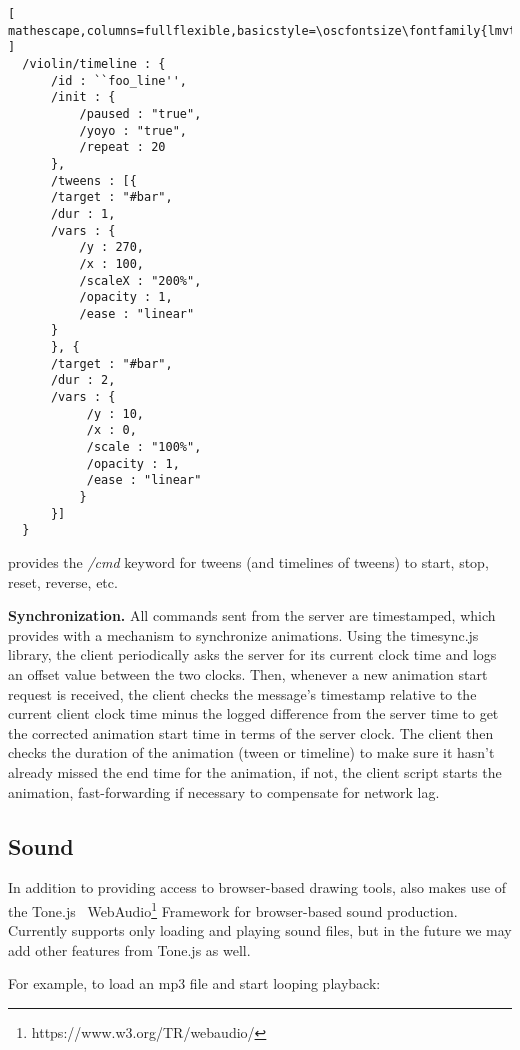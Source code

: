 \begin{minipage}{\linewidth}
\begin{lstlisting}[ mathescape,columns=fullflexible,basicstyle=\oscfontsize\fontfamily{lmvtt}\selectfont ]
  /violin/timeline : {
      /id : ``foo_line'',
      /init : {
          /paused : "true",
          /yoyo : "true",
          /repeat : 20
      },
      /tweens : [{
	  /target : "#bar",
	  /dur : 1,
	  /vars : {
	      /y : 270,
	      /x : 100,
	      /scaleX : "200%",
	      /opacity : 1,
	      /ease : "linear"
	  }
      }, {
	  /target : "#bar",
	  /dur : 2,
	  /vars : {
	       /y : 10,
	       /x : 0,
	       /scale : "100%",
	       /opacity : 1,
	       /ease : "linear"
      	  }
      }]
  }
\end{lstlisting}
\end{minipage}

\drawsocket provides the \textit{/cmd} keyword for tweens (and timelines of tweens) to start, stop, reset, reverse, etc.

\medskip
\noindent
\textbf{Synchronization.} 
All commands sent from the server are timestamped, which provides \drawsocket with a mechanism to synchronize animations.
Using the timesync.js library, the client periodically asks the server for its current clock time and logs an offset value between the two clocks.
Then, whenever a new animation start request is received, the client checks the message's timestamp relative to the current client clock time minus the logged difference from the server time to get the corrected animation start time in terms of the server clock.
The client then checks the duration of the animation (tween or timeline) to make sure it hasn't already missed the end time for the animation, if not, the client script starts the animation, fast-forwarding if necessary to compensate for network lag.

\subsection{Sound}\label{sec:sound}
In addition to providing access to browser-based drawing tools, \drawsocket also makes use of the Tone.js~\cite{mann2015interactive} WebAudio\footnote{https://www.w3.org/TR/webaudio/} Framework for browser-based sound production.
Currently \drawsocket supports only loading and playing sound files, but in the future we may add other features from Tone.js as well.

For example, to load an mp3 file and start looping playback:

